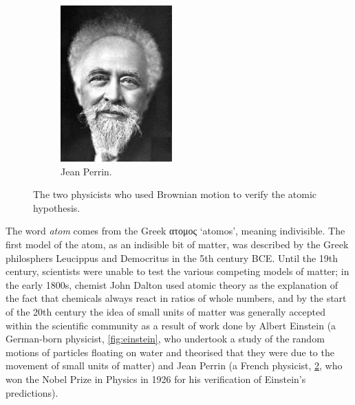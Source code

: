 \documentclass[a4paper]{amsbook}
\theoremstyle{definition}
\numberwithin{exercise}{chapter}
\numberwithin{exercise}{chapter}
\begin{document}
\begin{figure}
\begin{subfigure}{0.4\textwidth}
    \includegraphics[width = \textwidth]{perrin}
    \caption{Jean Perrin. \label{fig:perrin}}
  \end{subfigure}%
  \caption{The two physicists who used Brownian motion to verify the atomic hypothesis.}
\end{figure}

The word \textit{atom} comes from the Greek \textgreek{ατομος} `atomos', meaning indivisible. The first model of the atom, as
an indisible bit of matter, was described by the Greek philosphers Leucippus and Democritus in the 5th century BCE. Until the
19th century, scientists were unable to test the various competing models of matter; in the early 1800s, chemist John Dalton
used atomic theory as the explanation of the fact that chemicals always react in ratios of whole numbers, and by the start of
the 20th century the idea of small units of matter was generally accepted within the scientific community as a result of work
done by Albert Einstein (a German-born physicist, \cref{fig:einstein}, who undertook a study of the random motions of particles
floating on water and theorised that they were due to the movement of small units of matter) and Jean Perrin (a French
physicist, \cref{fig:perrin}, who won the Nobel Prize in Physics in 1926 for his verification of Einstein's predictions).
\end{document}
